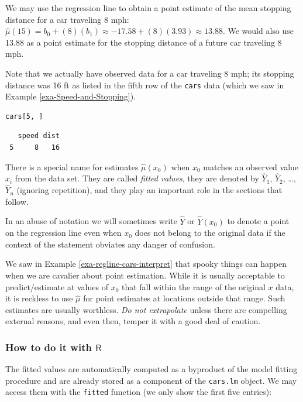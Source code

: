 \documentclass[captions=tableheading]{scrbook}
\begin{document}
\begin{example}
We may use the regression line to obtain a point estimate of the mean stopping distance for a car traveling 8 mph: \( \hat{\mu}(15) = b_{0} + (8) (b_{1}) \approx  -17.58 + (8) (  3.93 ) \approx 13.88 \). We would also use 13.88 as a point estimate for the stopping distance of a future car traveling 8 mph. 
\end{example}

Note that we actually have observed data for a car traveling 8 mph; its stopping distance was 16 ft as listed in the fifth row of the \texttt{cars} data (which we saw in Example \ref{exa-Speed-and-Stopping}).


\begin{verbatim}
cars[5, ]
\end{verbatim}

\begin{verbatim}
   speed dist
 5     8   16
\end{verbatim}

There is a special name for estimates \( \hat{\mu}(x_{0}) \) when \( x_{0} \) matches an observed value \(x_{i}\) from the data set. They are called \emph{fitted values}, they are denoted by \(\hat{Y}_{1}\), \(\hat{Y}_{2}\), \ldots{}, \(\hat{Y}_{n}\) (ignoring repetition), and they play an important role in the sections that follow. 

In an abuse of notation we will sometimes write \(\hat{Y}\) or \(\hat{Y}(x_{0})\) to denote a point on the regression line even when \(x_{0}\) does not belong to the original data if the context of the statement obviates any danger of confusion.

We saw in Example \ref{exa-regline-cars-interpret} that spooky things can happen when we are cavalier about point estimation. While it is usually acceptable to predict/estimate at values of \(x_{0}\) that fall within the range of the original \(x\) data, it is reckless to use \(\hat{\mu}\) for point estimates at locations outside that range. Such estimates are usually worthless. \emph{Do not extrapolate} unless there are compelling external reasons, and even then, temper it with a good deal of caution.
\subsubsection{How to do it with \(\mathsf{R}\)}
\label{sec-11-2-2-1}


The fitted values are automatically computed as a byproduct of the model fitting procedure and are already stored as a component of the \texttt{cars.lm} object. We may access them with the \texttt{fitted} function (we only show the first five entries):
\end{document}
